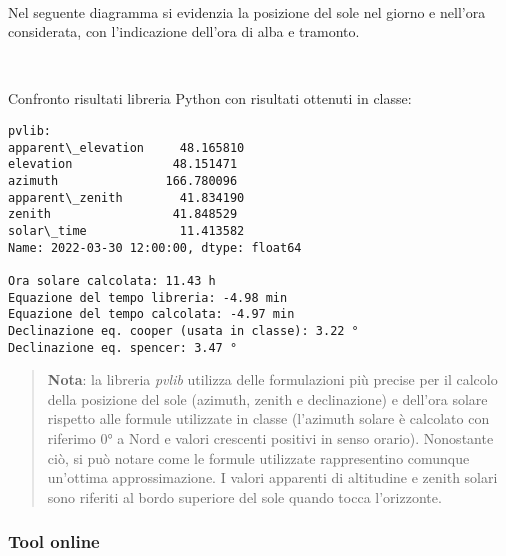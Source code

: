\documentclass[11pt]{article}
\begin{document}
    \begin{center}
    \end{center}
    { \hspace*{\fill} \\}
    
    Nel seguente diagramma si evidenzia la posizione del sole nel giorno e
nell'ora considerata, con l'indicazione dell'ora di alba e tramonto.

    \begin{center}
    \end{center}
    { \hspace*{\fill} \\}
    
    Confronto risultati libreria Python con risultati ottenuti in classe:

    \begin{Verbatim}[commandchars=\\\{\}]
pvlib:
apparent\_elevation     48.165810
elevation              48.151471
azimuth               166.780096
apparent\_zenith        41.834190
zenith                 41.848529
solar\_time             11.413582
Name: 2022-03-30 12:00:00, dtype: float64

Ora solare calcolata: 11.43 h
Equazione del tempo libreria: -4.98 min
Equazione del tempo calcolata: -4.97 min
Declinazione eq. cooper (usata in classe): 3.22 °
Declinazione eq. spencer: 3.47 °
    \end{Verbatim}

    \begin{quote}
\textbf{Nota}: la libreria \emph{pvlib} utilizza delle formulazioni più
precise per il calcolo della posizione del sole (azimuth, zenith e
declinazione) e dell'ora solare rispetto alle formule utilizzate in
classe (l'azimuth solare è calcolato con riferimo 0° a Nord e valori
crescenti positivi in senso orario). Nonostante ciò, si può notare come
le formule utilizzate rappresentino comunque un'ottima approssimazione.
I valori apparenti di altitudine e zenith solari sono riferiti al bordo
superiore del sole quando tocca l'orizzonte.
\end{quote}

    \hypertarget{tool-online}{%
\subsubsection{Tool online}\label{tool-online}}
\end{document}
